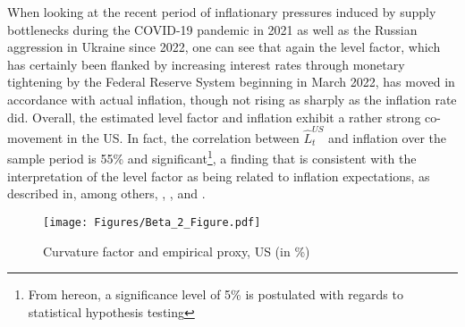 When looking at the recent period of inflationary pressures induced by supply bottlenecks during the COVID-19 pandemic in 2021 as well as the Russian aggression in Ukraine since 2022, one can see that again the level factor, which has certainly been flanked by increasing interest rates through monetary tightening by the Federal Reserve System beginning in March 2022, has moved in accordance with actual inflation, though not rising as sharply as the inflation rate did. 
Overall, the estimated level factor and inflation exhibit a rather strong co-movement in the US.
In fact, the correlation between $\hat{L}^{US}_{t}$ and inflation over the sample period is 55\% and significant\footnote{From hereon, a significance level of 5\% is postulated with regards to statistical hypothesis testing}, a finding that is consistent with the interpretation of the level factor as being related to inflation expectations, as described in, among others, \citet{dewachter2006macro}, \citet{rudebusch2008macro}, and \citet{diebold2006macroeconomy}.



\begin{figure}[!t]
    \centering
    \texttt{[image: Figures/Beta\_2\_Figure.pdf]}
    \caption{Curvature factor and empirical proxy, US (in \%)}
    \label{fig:curvature_factor_us}
\end{figure}



